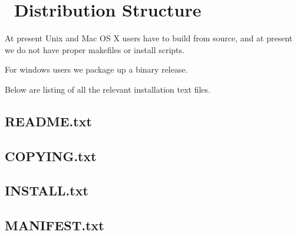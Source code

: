 \section{\ Distribution Structure}

At present Unix and Mac OS X users have to build from source,
and at present we do not have proper makefiles or install scripts.

For windows users we package up a binary release.

Below are listing of all the relevant installation text files.

\newpage
\subsection{README.txt}


\newpage
\subsection{COPYING.txt}


\newpage
\subsection{INSTALL.txt}


\newpage
\subsection{MANIFEST.txt}

